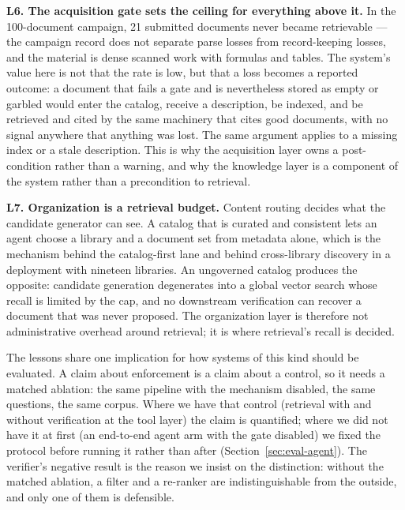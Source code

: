 \noindent\textbf{L6. The acquisition gate sets the ceiling for everything
above it.} In the 100-document campaign, 21 submitted documents never became
retrievable --- the campaign record does not separate parse losses from
record-keeping losses, and the material is dense scanned work with formulas
and tables. The system's value here is
not that the rate is low, but that a loss becomes a reported outcome: a
document that fails a gate and is nevertheless stored as empty or garbled
would enter the
catalog, receive a description, be indexed, and be retrieved and cited by the
same machinery that cites good documents, with no signal anywhere that
anything was lost. The same argument applies to a missing index or a stale
description. This is why the acquisition layer owns a post-condition rather
than a warning, and why the knowledge layer is a component of the system
rather than a precondition to retrieval.

\noindent\textbf{L7. Organization is a retrieval budget.} Content routing
decides what the candidate generator can see. A catalog that is curated and
consistent lets an agent choose a library and a document set from metadata
alone, which is the mechanism behind the catalog-first lane and behind
cross-library discovery in a deployment with nineteen libraries. An
ungoverned catalog produces the opposite: candidate generation degenerates
into a global vector search whose recall is limited by the cap, and no
downstream verification can recover a document that was never proposed. The
organization layer is therefore not administrative overhead around retrieval;
it is where retrieval's recall is decided.

The lessons share one implication for how systems of this kind should be
evaluated. A claim about enforcement is a claim about a control, so it needs a
matched ablation: the same pipeline with the mechanism disabled, the same
questions, the same corpus. Where we have that control (retrieval with and
without verification at the tool layer) the claim is quantified; where we did
not have it at first (an end-to-end agent arm with the gate disabled) we fixed
the protocol before running it rather than after
(Section~\ref{sec:eval-agent}). The verifier's negative result is the reason
we insist on the distinction: without the matched ablation, a filter and a
re-ranker are indistinguishable from the outside, and only one of them is
defensible.
